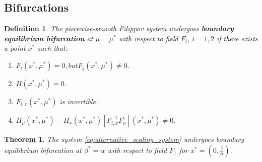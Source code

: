 \documentclass[12pt,a4paper]{article}
\newtheorem{theorem}{Theorem}
\newtheorem{definition}{Definition}
\begin{document}
\subsection{Bifurcations}
\begin{definition}\cite{bernardo2008piecewise}
    The piecewise-smooth Filippov system undergoes \textbf{boundary equilibrium bifurcation} at $\mu=\mu^*$ with respect to field $F_i$, $i=1, 2$ if there exists a point $x^*$ such that:
    \begin{enumerate}
        \item $F_i(x^*,\mu^*)=0, but F_j (x^*,\mu^*) \neq 0.$
        \item $H(x^*,\mu^*)=0$.
        \item $F_{i,x}(x^*,\mu^*)$ is invertible.
        \item $H_{\mu}(x^*,\mu^*) - H_x(x^*,\mu^*)[F_{i,x}^{-1} F_{\mu}^{i}](x^*,\mu^*)\neq 0.$
    \end{enumerate}
\end{definition}

\begin{theorem}
    The system \eqref{eq:alternative_scaling_system} undergoes boundary equilibrium bifurcation at $\beta^*=\alpha$ with respect to field $F_1$ for $x^*=\left(0, \frac{\beta}{\alpha} \right)$.
\end{theorem}
\end{document}
